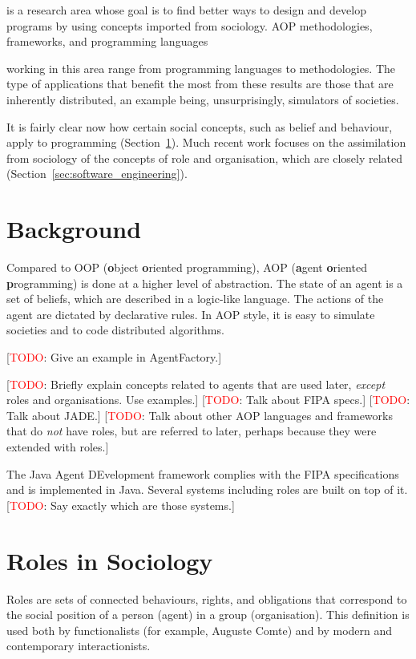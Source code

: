 \documentclass{article}
\def\fb#1{\textbf{#1}}
\newcommand{\todo}[1]{[\textcolor{red}{TODO}: #1]}
\begin{document}
is a research area whose goal is
to find better ways to design and develop programs by using concepts imported
from sociology. AOP methodologies, frameworks, and programming languages 

working in this area range from
programming languages to methodologies. The type of applications that benefit
the most from these results are those that are inherently distributed, an
example being, unsurprisingly, simulators of societies.

It is fairly clear now how certain social concepts,
such as belief and behaviour, apply to programming
(Section~\ref{sec:background}). Much recent work focuses
on the assimilation from sociology of the concepts
of role and organisation, which are closely related
(Section~\ref{sec:software_engineering}).
\section{Background}
\label{sec:background}

Compared to OOP (\fb object \fb oriented programming), AOP (\fb
agent \fb oriented \fb programming) is done at a higher level of
abstraction. The state of an agent is a set of beliefs, which
are described in a logic-like language. The actions of the agent
are dictated by declarative rules. In AOP style, it is easy to
simulate societies and to code distributed algorithms.

\todo{Give an example in AgentFactory.}

\todo{Briefly explain concepts related to agents that are used later,
  \emph{except} roles and organisations. Use examples.}
\todo{Talk about FIPA specs.}
\todo{Talk about JADE.}
\todo{Talk about other AOP languages and frameworks that do \emph{not}
  have roles, but are referred to later, perhaps because they were
  extended with roles.}

The Java Agent DEvelopment framework complies with the FIPA
specifications and is implemented in Java. Several systems
including roles are built on top of it. \todo{Say exactly which
are those systems.}
\section{Roles in Sociology}

Roles are sets of connected behaviours, rights, and obligations
that correspond to the social position of a person (agent) in a
group (organisation). This definition is used both by functionalists
(for example, Auguste Comte) and by modern and contemporary
interactionists.
\end{document}
